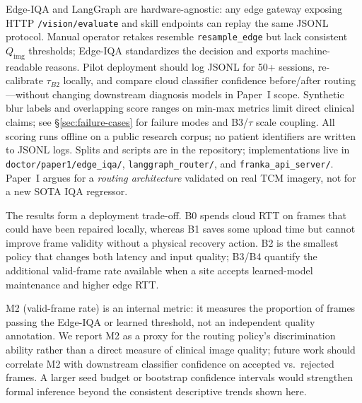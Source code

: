 Edge-IQA and LangGraph are hardware-agnostic: any edge gateway exposing HTTP \texttt{/vision/evaluate} and skill endpoints can replay the same JSONL protocol.
Manual operator retakes resemble \texttt{resample\_edge} but lack consistent $Q_{\mathrm{img}}$ thresholds; Edge-IQA standardizes the decision and exports machine-readable reasons.
Pilot deployment should log JSONL for 50+ sessions, re-calibrate $\tau_{B2}$ locally, and compare cloud classifier confidence before/after routing---without changing downstream diagnosis models in Paper~I scope.
Synthetic blur labels and overlapping score ranges on min-max metrics limit direct clinical claims; see \S\ref{sec:failure-cases} for failure modes and B3/$\tau$ scale coupling.
All scoring runs offline on a public research corpus; no patient identifiers are written to JSONL logs.
Splits and scripts are in the repository; implementations live in \texttt{doctor/paper1/edge\_iqa/}, \texttt{langgraph\_router/}, and \texttt{franka\_api\_server/}.
Paper~I argues for a \emph{routing architecture} validated on real TCM imagery, not for a new SOTA IQA regressor.

The results form a deployment trade-off.
B0 spends cloud RTT on frames that could have been repaired locally, whereas B1 saves some upload time but cannot improve frame validity without a physical recovery action.
B2 is the smallest policy that changes both latency and input quality; B3/B4 quantify the additional valid-frame rate available when a site accepts learned-model maintenance and higher edge RTT.

M2 (valid-frame rate) is an internal metric: it measures the proportion of frames passing the Edge-IQA or learned threshold, not an independent quality annotation.
We report M2 as a proxy for the routing policy's discrimination ability rather than a direct measure of clinical image quality; future work should correlate M2 with downstream classifier confidence on accepted vs.\ rejected frames.
A larger seed budget or bootstrap confidence intervals would strengthen formal inference beyond the consistent descriptive trends shown here.
